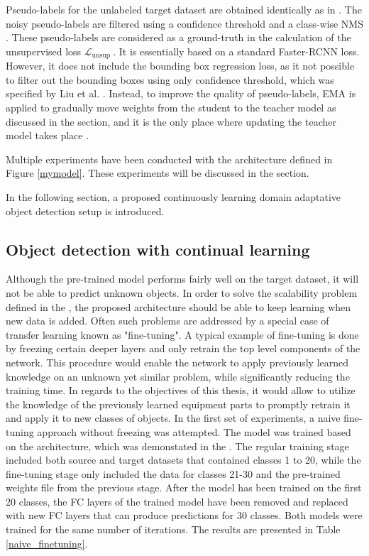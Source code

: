 Pseudo-labels for the unlabeled target dataset are obtained identically as in \cite{Li2021}. The noisy pseudo-labels are filtered using a confidence threshold and a class-wise NMS \cite{Liu2021}. These pseudo-labels are considered as a ground-truth in the calculation of the unsupervised loss $\mathcal{L}_{\text {unsup }}$. It is essentially based on a standard Faster-RCNN loss. However, it does not include the bounding box regression loss, as it not possible to filter out the bounding boxes using only confidence threshold, which was specified by Liu et al. \cite{Liu2021}.  Instead, to improve the quality of pseudo-labels, EMA is applied to gradually move weights from the student to the teacher model as discussed in the   section, and it is the only place where updating the teacher model takes place \cite{Li2021}.  
 
Multiple experiments have been conducted with the architecture defined in Figure \ref{mymodel}. These experiments will be discussed in the  section.  

In the following section, a proposed continuously learning domain adaptative object detection setup is introduced. 


\subsection{Object detection with continual learning}
\label{cont_learning_section} 
Although the pre-trained model performs fairly well on the target dataset, it will not be able to predict unknown objects. In order to solve the scalability problem defined in the , the proposed architecture should be able to keep learning when new data is added. Often such problems are addressed by a special case of transfer learning known as "fine-tuning". A typical example of fine-tuning is done by freezing certain deeper layers and only retrain the top level components of the network. This procedure would enable the network to apply previously learned knowledge on an unknown yet similar problem, while significantly reducing the training time. In regards to the objectives of this thesis, it would allow to utilize the knowledge of the previously learned equipment parts to promptly retrain it and apply it to new classes of objects. 
In the first set of experiments, a naive fine-tuning approach without freezing was attempted. The model was trained based on the architecture, which was demonstated in the . The regular training stage included both source and target datasets that contained classes 1 to 20, while the fine-tuning stage only included the data for classes 21-30 and the pre-trained weights file from the previous stage. After the model has been trained on the first 20 classes, the FC layers of the trained model have been removed and replaced with new FC layers that can produce predictions for 30 classes. Both models were trained for the same number of iterations. The results are presented in Table \ref{naive_finetuning}.

